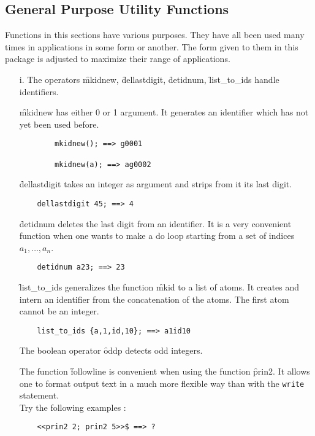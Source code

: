 \subsection{General Purpose Utility Functions}
Functions in this sections have various purposes. They have all been used
many times in applications in some form or another. The form given
to them in this package is adjusted to maximize their range of applications.
\begin{itemize}
\item[i.]
\hypertarget{operator:MKIDNEW}{}
\hypertarget{operator:DELLASTDIGIT}{}
\hypertarget{operator:DETIDNUM}{}
\hypertarget{operator:LIST_TO_IDS}{}
The operators \f{mkidnew}, \f{dellastdigit}, \f{detidnum}, \f{list\_to\_ids}
handle identifiers. 

\f{mkidnew} has either 0 or 1 argument. 
It generates an identifier which has not yet been used before.
\begin{verbatim}
        mkidnew(); ==> g0001

        mkidnew(a); ==> ag0002
\end{verbatim}
\f{dellastdigit} takes an integer as argument and strips from it its last
digit.
\begin{verbatim}
    dellastdigit 45; ==> 4
\end{verbatim}
\f{detidnum} deletes the last digit from an
identifier. It is a very convenient function when one wants to make a do
loop starting from a set of indices $ a_1, \ldots , a_{n} $.
\begin{verbatim}
    detidnum a23; ==> 23
\end{verbatim}

\f{list\_to\_ids} generalizes the function \f{mkid} to a list of
atoms. It creates and intern an identifier from the concatenation of
the atoms. The first atom cannot be an integer.
\begin{verbatim}
    list_to_ids {a,1,id,10}; ==> a1id10
\end{verbatim}
\hypertarget{operator:ODDP}{}
The boolean operator \f{oddp}  detects odd integers.

\hypertarget{operator:FOLLOWLINE}{}
The function \f{followline} is convenient when using the function \f{prin2}.
It allows one to format output text in a much more flexible way than with
the \texttt{write} statement. \\
Try the following examples :
\begin{verbatim}
    <<prin2 2; prin2 5>>$ ==> ?


\end{verbatim}
\end{itemize}
